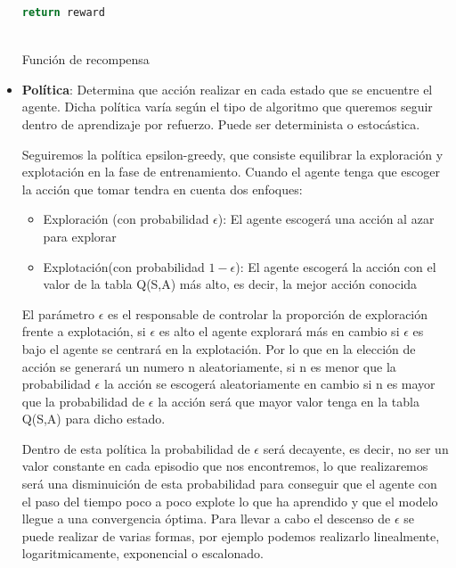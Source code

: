 \begin{itemize}
\begin{code}[H]
\begin{lstlisting}[language=Python]
        return reward
       
      \end{lstlisting}
      \caption[Función de recompensa]{Función de recompensa}
      \label{cod:codejemplo}
      \end{code}
    \item \textbf{Política}: Determina que acción realizar en cada estado que se encuentre el agente. Dicha política varía según el tipo de algoritmo que queremos seguir dentro de aprendizaje por refuerzo.
    Puede ser determinista o estocástica. \newline

    Seguiremos la política epsilon-greedy\cite{Epsilon-greedy}, que consiste 
 equilibrar la exploración y explotación en la fase de entrenamiento. Cuando el agente tenga que escoger la acción que tomar tendra en cuenta dos enfoques:
 
 \begin{itemize}
   \item Exploración (con probabilidad $\epsilon$): El agente escogerá una acción al azar para explorar
   \item Explotación(con probabilidad $ 1 - \epsilon$): El agente escogerá la acción con el valor de la tabla Q(S,A) más alto, es decir, la mejor acción conocida
 \end{itemize}
 
 El parámetro $\epsilon$ es el responsable de controlar la proporción de exploración frente a explotación, si $\epsilon$  es alto el agente explorará más en cambio si $\epsilon$ es bajo
 el agente se centrará en la explotación. Por lo que en la elección de acción se generará un numero n aleatoriamente, si n es menor que la probabilidad $\epsilon$ la acción se escogerá aleatoriamente
 en cambio si n es mayor que la probabilidad de $\epsilon$ la acción será que mayor valor tenga en la tabla Q(S,A) para dicho estado. \newline
 
 Dentro de esta política la probabilidad de $\epsilon$ será decayente, es decir, no ser un valor constante en cada episodio que nos encontremos, lo que realizaremos será una disminuición 
 de esta probabilidad para conseguir que el agente con el paso del tiempo poco a poco explote lo que ha aprendido y que el modelo llegue a una convergencia óptima. Para llevar a cabo el descenso
 de $\epsilon$ se puede realizar de varias formas, por ejemplo podemos realizarlo linealmente, logaritmicamente, exponencial o escalonado. \newline
  \end{itemize}

